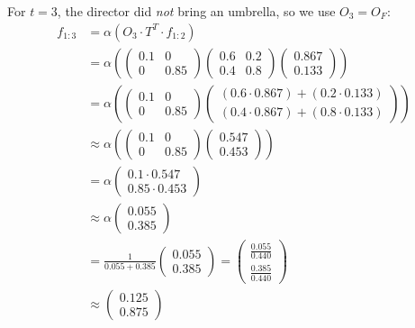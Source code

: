 For $t=3$, the director did \textit{not} bring an umbrella, so we use $O_3 = O_F$:
\begin{align*}
f_{1:3} &= \alpha \left( O_3 \cdot T^T \cdot f_{1:2} \right) \\
&= \alpha \left( 
\begin{pmatrix}
0.1 & 0 \\
0 & 0.85
\end{pmatrix}
\begin{pmatrix}
0.6 & 0.2 \\
0.4 & 0.8
\end{pmatrix}
\begin{pmatrix}
0.867 \\
0.133
\end{pmatrix}
\right) \\
&= \alpha \left( 
\begin{pmatrix}
0.1 & 0 \\
0 & 0.85
\end{pmatrix}
\begin{pmatrix}
(0.6 \cdot 0.867) + (0.2 \cdot 0.133) \\
(0.4 \cdot 0.867) + (0.8 \cdot 0.133)
\end{pmatrix}
\right) \\
&\approx \alpha \left( 
\begin{pmatrix}
0.1 & 0 \\
0 & 0.85
\end{pmatrix}
\begin{pmatrix}
0.547 \\
0.453
\end{pmatrix}
\right) \\
&= \alpha 
\begin{pmatrix}
0.1 \cdot 0.547 \\
0.85 \cdot 0.453
\end{pmatrix} \\
&\approx \alpha 
\begin{pmatrix}
0.055 \\
0.385
\end{pmatrix} \\
&= \frac{1}{0.055 + 0.385} \begin{pmatrix} 0.055 \\ 0.385 \end{pmatrix} = \begin{pmatrix} \frac{0.055}{0.440} \\ \frac{0.385}{0.440} \end{pmatrix} \\
&\approx \begin{pmatrix} 0.125 \\ 0.875 \end{pmatrix}
\end{align*} 

